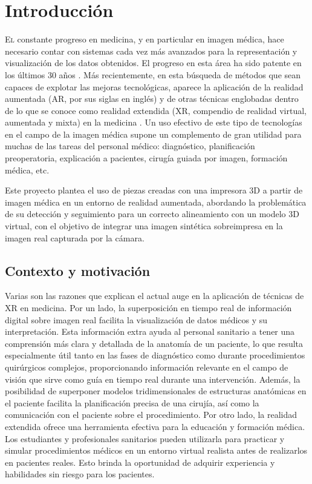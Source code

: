 \chapter{Introducción}
\label{chap:introducion}

\lettrine{E}{l} constante progreso en medicina, y en particular en imagen médica, hace necesario contar con sistemas cada vez más avanzados para la representación y visualización de los datos obtenidos. El progreso en esta área ha sido patente en los últimos 30 años \cite{Botha2014}. Más recientemente, en esta búsqueda de métodos que sean capaces de explotar las mejoras tecnológicas, aparece la aplicación de la realidad aumentada (AR, por sus siglas en inglés) y de otras técnicas englobadas dentro de lo que se conoce como realidad extendida (XR, compendio de realidad virtual, aumentada y mixta) en la medicina \cite{Sielhorst2008}. Un uso efectivo de este tipo de tecnologías en el campo de la imagen médica supone un complemento de gran utilidad para muchas de las tareas del personal médico: diagnóstico, planificación preoperatoria, explicación a pacientes, cirugía guiada por imagen, formación médica, etc.

Este proyecto plantea el uso de piezas creadas con una impresora 3D a partir de imagen médica en un entorno de realidad aumentada, abordando la problemática de su detección y seguimiento para un correcto alineamiento con un modelo 3D virtual, con el objetivo de integrar una imagen sintética sobreimpresa en la imagen real capturada por la cámara.


\section{Contexto y motivación}

Varias son las razones que explican el actual auge en la aplicación de técnicas de XR en medicina. Por un lado, la superposición en tiempo real de información digital sobre imagen real facilita la visualización de datos médicos y su interpretación. Esta información extra ayuda al personal sanitario a tener una comprensión más clara y detallada de la anatomía de un paciente, lo que resulta especialmente útil tanto en las fases de diagnóstico como durante procedimientos quirúrgicos complejos, proporcionando información relevante en el campo de visión que sirve como guía en tiempo real durante una intervención. Además, la posibilidad de superponer modelos tridimensionales de estructuras anatómicas en el paciente facilita la planificación precisa de una cirujía, así como la comunicación con el paciente sobre el procedimiento. Por otro lado, la realidad extendida ofrece una herramienta efectiva para la educación y formación médica. Los estudiantes y profesionales sanitarios pueden utilizarla para practicar y simular procedimientos médicos en un entorno virtual realista antes de realizarlos en pacientes reales. Esto brinda la oportunidad de adquirir experiencia y habilidades sin riesgo para los pacientes.

